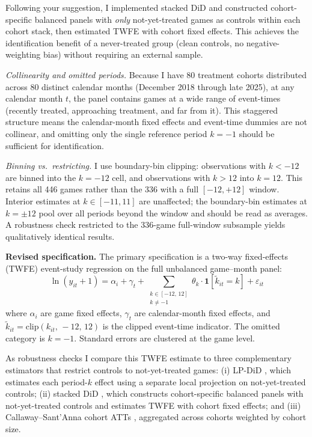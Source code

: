 \documentclass[11pt]{article}
\begin{document}
Following your suggestion, I implemented stacked DiD \citep{cengiz2019} 
and constructed cohort-specific
balanced panels with \textit{only} not-yet-treated games as controls within
each cohort stack, then estimated TWFE with cohort fixed effects. This
achieves the identification benefit of a never-treated group (clean controls,
no negative-weighting bias) without requiring an external sample. 

\textit{Collinearity and omitted periods.}
Because I have 80 treatment cohorts distributed across 80 distinct calendar
months (December 2018 through late 2025), at any calendar
month $t$, the panel contains games at a wide range of event-times (recently
treated, approaching treatment, and far from it). This staggered
structure means the calendar-month fixed effects and event-time dummies are
not collinear, and omitting only the single reference period $k = -1$ should be
sufficient for identification. 

\textit{Binning vs.\ restricting.}
I use boundary-bin clipping: observations with $k < -12$ are binned into the
$k = -12$ cell, and observations with $k > 12$ into $k = 12$. This retains
all 446 games rather than the 336 with a full $[-12,+12]$ window. Interior
estimates at $k \in [-11, 11]$ are unaffected; the boundary-bin estimates at
$k = \pm 12$ pool over all periods beyond the window and should be read as
averages. A robustness check restricted to the 336-game full-window subsample
yields qualitatively identical results.

\textbf{Revised specification.}
The primary specification is a two-way fixed-effects (TWFE) event-study
regression on the full unbalanced game--month panel:
\begin{equation}
\label{eq:pooled}
\ln(y_{it} + 1) = \alpha_i + \gamma_t +
  \sum_{\substack{k \in [-12,\,12] \\ k \neq -1}}
  \theta_k \cdot \mathbf{1}[\tilde{k}_{it} = k]
  + \varepsilon_{it}
\end{equation}
where $\alpha_i$ are game fixed effects, $\gamma_t$ are calendar-month fixed
effects, and $\tilde{k}_{it} = \text{clip}(k_{it},\,-12,\,12)$ is the
clipped event-time indicator. The omitted category is $k = -1$. Standard
errors are clustered at the game level.

As robustness checks I compare this TWFE estimate to three complementary
estimators that restrict controls to not-yet-treated games: (i) LP-DiD
\citep{dube2023}, which estimates each period-$k$ effect using a separate
local projection on not-yet-treated controls; (ii) stacked DiD
\citep{cengiz2019}, which constructs cohort-specific balanced panels with
not-yet-treated controls and estimates TWFE with cohort fixed effects; and
(iii) Callaway--Sant'Anna cohort ATTs \citep{callaway2021}, aggregated
across cohorts weighted by cohort size.
\end{document}
